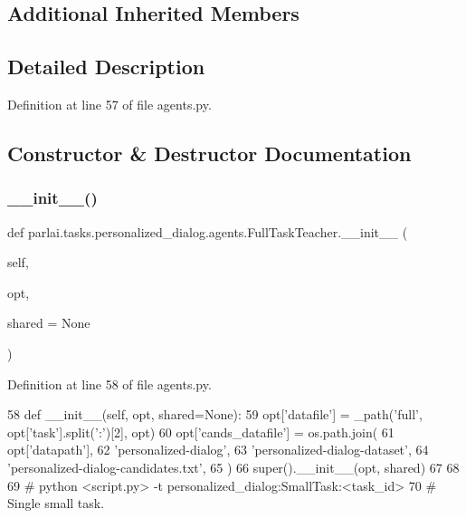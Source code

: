 \subsection*{Additional Inherited Members}


\subsection{Detailed Description}


Definition at line 57 of file agents.\+py.



\subsection{Constructor \& Destructor Documentation}
\mbox{\label{classparlai_1_1tasks_1_1personalized__dialog_1_1agents_1_1FullTaskTeacher_a2f07307405aafc3bc903ce7f172f45c0}} 
\subsubsection{\texorpdfstring{\+\_\+\+\_\+init\+\_\+\+\_\+()}{\_\_init\_\_()}}
{\footnotesize\ttfamily def parlai.\+tasks.\+personalized\+\_\+dialog.\+agents.\+Full\+Task\+Teacher.\+\_\+\+\_\+init\+\_\+\+\_\+ (\begin{DoxyParamCaption}\item[{}]{self,  }\item[{}]{opt,  }\item[{}]{shared = {\ttfamily None} }\end{DoxyParamCaption})}



Definition at line 58 of file agents.\+py.


\begin{DoxyCode}
58     \textcolor{keyword}{def }\_\_init\_\_(self, opt, shared=None):
59         opt[\textcolor{stringliteral}{'datafile'}] = \_path(\textcolor{stringliteral}{'full'}, opt[\textcolor{stringliteral}{'task'}].split(\textcolor{stringliteral}{':'})[2], opt)
60         opt[\textcolor{stringliteral}{'cands\_datafile'}] = os.path.join(
61             opt[\textcolor{stringliteral}{'datapath'}],
62             \textcolor{stringliteral}{'personalized-dialog'},
63             \textcolor{stringliteral}{'personalized-dialog-dataset'},
64             \textcolor{stringliteral}{'personalized-dialog-candidates.txt'},
65         )
66         super().\_\_init\_\_(opt, shared)
67 
68 
69 \textcolor{comment}{# python <script.py> -t personalized\_dialog:SmallTask:<task\_id>}
70 \textcolor{comment}{# Single small task.}
\end{DoxyCode}


